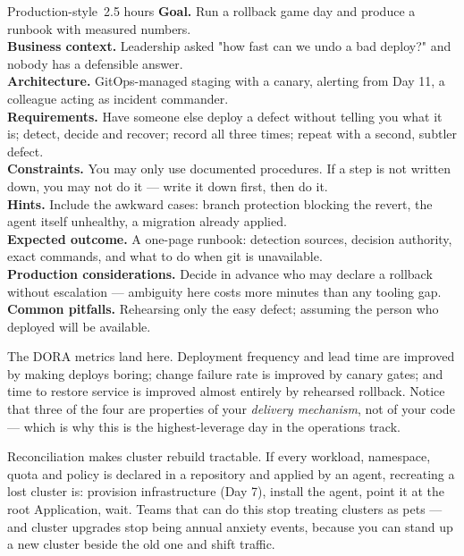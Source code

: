 \begin{minilab}{Production-style}{~2.5 hours}
\textbf{Goal.} Run a rollback game day and produce a runbook with measured numbers.\\
\textbf{Business context.} Leadership asked "how fast can we undo a bad deploy?" and nobody has a defensible answer.\\
\textbf{Architecture.} GitOps-managed staging with a canary, alerting from Day 11, a colleague acting as incident commander.\\
\textbf{Requirements.} Have someone else deploy a defect without telling you what it is; detect, decide and recover; record all three times; repeat with a second, subtler defect.\\
\textbf{Constraints.} You may only use documented procedures. If a step is not written down, you may not do it --- write it down first, then do it.\\
\textbf{Hints.} Include the awkward cases: branch protection blocking the revert, the agent itself unhealthy, a migration already applied.\\
\textbf{Expected outcome.} A one-page runbook: detection sources, decision authority, exact commands, and what to do when git is unavailable.\\
\textbf{Production considerations.} Decide in advance who may declare a rollback without escalation --- ambiguity here costs more minutes than any tooling gap.\\
\textbf{Common pitfalls.} Rehearsing only the easy defect; assuming the person who deployed will be available.
\end{minilab}


\begin{opsnote}
The DORA metrics land here. Deployment frequency and lead time are improved by making deploys boring; change failure rate is improved by canary gates; and time to restore service is improved almost entirely by rehearsed rollback. Notice that three of the four are properties of your \emph{delivery mechanism}, not of your code --- which is why this is the highest-leverage day in the operations track.
\end{opsnote}

\begin{infranote}
Reconciliation makes cluster rebuild tractable. If every workload, namespace, quota and policy is declared in a repository and applied by an agent, recreating a lost cluster is: provision infrastructure (Day 7), install the agent, point it at the root Application, wait. Teams that can do this stop treating clusters as pets --- and cluster upgrades stop being annual anxiety events, because you can stand up a new cluster beside the old one and shift traffic.
\end{infranote}

